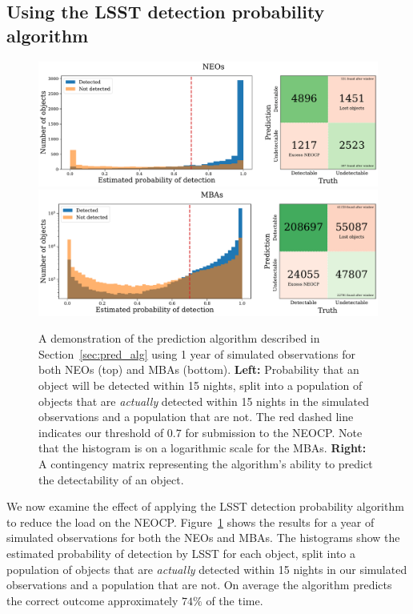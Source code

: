 \documentclass[twocolumn]{aastex631}
\newcommand{\efficiencyAlg}{74}
\newcommand{\thresholdAlg}{0.7}
\begin{document}
\subsection{Using the LSST detection probability algorithm}\label{sec:using_alg}

\begin{figure}[htb]
    \centering
    \includegraphics[width=\textwidth]{contingency_neo.pdf}
    \includegraphics[width=\textwidth]{contingency_mba.pdf}
    \caption{A demonstration of the prediction algorithm described in Section~\ref{sec:pred_alg} using 1 year of simulated observations for both NEOs (top) and MBAs (bottom). \textbf{Left:} Probability that an object will be detected within 15 nights, split into a population of objects that are \textit{actually} detected within 15 nights in the simulated observations and a population that are not. The red dashed line indicates our threshold of $\thresholdAlg{}$ for submission to the NEOCP. Note that the histogram is on a logarithmic scale for the MBAs. \textbf{Right:} A contingency matrix representing the algorithm's ability to predict the detectability of an object.}
    \label{fig:contingency}
\end{figure}
We now examine the effect of applying the LSST detection probability algorithm to reduce the load on the NEOCP. Figure~\ref{fig:contingency} shows the results for a year of simulated observations for both the NEOs and MBAs. The histograms show the estimated probability of detection by LSST for each object, split into a population of objects that are \textit{actually} detected within 15 nights in our simulated observations and a population that are not. On average the algorithm predicts the correct outcome approximately $\efficiencyAlg{}\%$ of the time.
\end{document}
